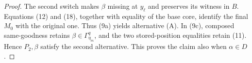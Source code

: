\begin{proof}
The second switch makes \(\beta\) missing at \(y_\ell\) and preserves
its witness in \(B\).  Equations (12) and (18), together with equality of
the base core, identify the final \(M_0\) with the original one.  Thus
(9a) yields alternative (A).  In (9c), composed same-goodness retains
\(\beta\in\Gamma^q_{\eta_m}\), and the two stored-position equalities
retain (11).  Hence \(P_2,\beta\) satisfy the second alternative.  This
proves the claim also when \(\alpha\in D\).
\end{proof}
